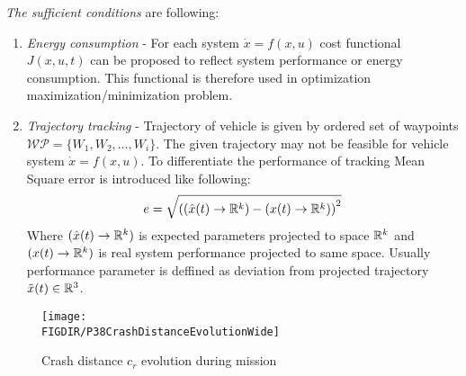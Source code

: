 \emph{The sufficient conditions} are following:
\begin{enumerate}
    \item\emph{Energy consumption} - For each system $\dot{x}=f(x,u)$ cost functional $J(x,u,t)$ can be proposed to reflect system performance or energy consumption. This functional is therefore used in optimization maximization/minimization problem.
    \item\emph{Trajectory tracking} - Trajectory of vehicle is given by ordered set of waypoints $\mathscr{WP}=\{W_1,W_2,\dots,W_i\}$. The given trajectory may not be feasible for vehicle system $\dot{x}=f(x,u)$. To differentiate the performance of tracking Mean Square error is introduced like following:
    \begin{equation}
        e= \sqrt{\left((\hat{x}(t)\to\mathbb{R}^k)-(x(t)\to\mathbb{R}^k)\right)^2}
    \end{equation}
    \noindent Where $(\hat{x}(t)\to\mathbb{R}^k)$ is expected parameters projected to space $\mathbb{R}^k$ and $(x(t)\to\mathbb{R}^k)$ is real system performance projected to same space. Usually performance parameter is deffined as deviation from projected trajectory $\tilde{x}(t)\in\mathbb{R}^3$.
\end{enumerate}

\begin{figure}[H]
    \centering
    \texttt{[image: \\FIGDIR/P38CrashDistanceEvolutionWide]}
    \caption{Crash distance $c_r$ evolution during mission}
    \label{fig:P38CrashDistanceEvolutionWide}
\end{figure}

